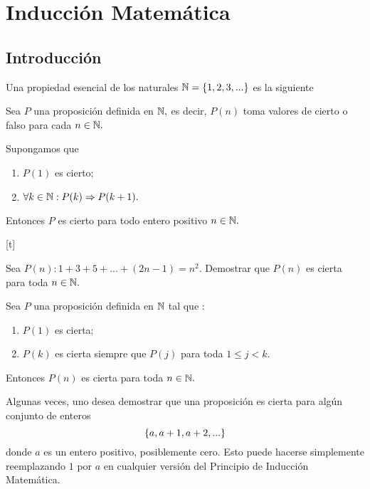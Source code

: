 \section{Inducci\'on Matem\'atica}

\subsection{Introducci\'on}


	Una propiedad esencial de los naturales $\mathbb{N}=\left\{ 1,2,3,... \right\}$  es la siguiente
	
	
	\begin{ax}
		Sea $P$ una proposici\'on definida en $\mathbb{N},$ es decir, $P(n)$ toma valores de cierto o falso para cada $n\in \mathbb{N}.$
		
		Supongamos que
		\begin{enumerate}
			\item $P(1)$ es cierto;
			\item $\forall k \in \mathbb{N}: P(k) \Rightarrow P(k+1).$
		\end{enumerate}
		
		Entonces $P$ es {cierto} para todo entero positivo $n\in \mathbb{N}.$
	\end{ax}
	


[t]
	\begin{exmp}
		Sea $P(n):1+3+5+...+(2n-1)=n^2.$ Demostrar que $P(n)$ es cierta para toda $n \in \mathbb{N}.$ 
	\end{exmp}



	\begin{ax}
		Sea $P$ una proposici\'on definida en $\mathbb{N}$ tal que :
		\begin{enumerate}
			\item $P(1)$ es cierta;
			\item $P(k)$ es cierta siempre que $P(j)$ para toda $1\leq j < k.$
		\end{enumerate}
		Entonces $P(n)$ es cierta para toda $n\in \mathbb{N}.$
	\end{ax}
	



	\begin{rem}
		Algunas veces, uno desea demostrar que una proposici\'on es cierta para alg\'un conjunto de enteros
		$$
		\left\{ a,a+1, a+2,... \right\}
		$$
		donde $a$ es un entero positivo, posiblemente cero. Esto puede hacerse simplemente reemplazando $1$ por $a$ en cualquier versi\'on del Principio de Inducci\'on Matem\'atica. 
	\end{rem}
	


